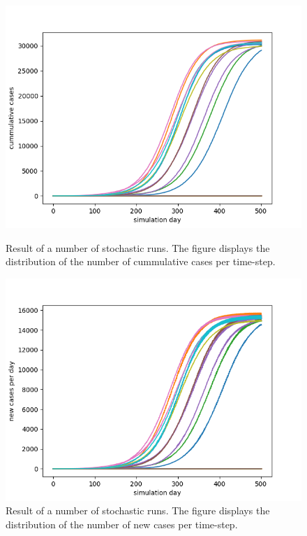 \documentclass[runningheads]{llncs}
\begin{document}
	\begin{figure}
		\includegraphics[width=\textwidth]{fig1.png}
		\caption{Result of a number of stochastic runs. The figure displays the distribution of the number of cummulative cases per time-step.} 	
		\label{fig1}
		
		\includegraphics[width=\textwidth]{fig2.png}
		\caption{Result of a number of stochastic runs. The figure displays the distribution of the number of new cases per time-step.} 
		\label{fig2}
	\end{figure} 
	\newpage
	
	
\end{document}
